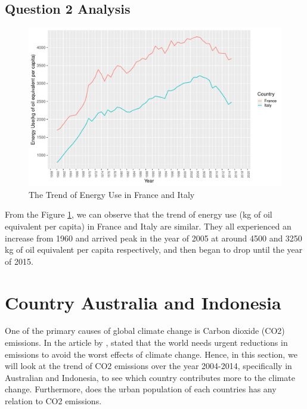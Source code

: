 \documentclass[11pt,a4paper,]{article}
\begin{document}
\clearpage

\hypertarget{question-2-analysis-2}{%
\subsection{Question 2 Analysis}\label{question-2-analysis-2}}

\begin{figure}

{\centering \includegraphics{report_files/figure-latex/trend-1} 

}

\caption{The Trend of Energy Use in France and Italy}\label{fig:trend}
\end{figure}

From the Figure \ref{fig:trend}, we can observe that the trend of energy use (kg of oil equivalent per capita) in France and Italy are similar. They all experienced an increase from 1960 and arrived peak in the year of 2005 at around 4500 and 3250 kg of oil equivalent per capita respectively, and then began to drop until the year of 2015.

\section*{Country Australia and Indonesia}

One of the primary causes of global climate change is Carbon dioxide (CO2) emissions. In the article by \textcite{co2article} , stated that the world needs urgent reductions in emissions to avoid the worst effects of climate change. Hence, in this section, we will look at the trend of CO2 emissions over the year 2004-2014, specifically in Australian and Indonesia, to see which country contributes more to the climate change. Furthermore, does the urban population of each countries has any relation to CO2 emissions.
\end{document}
